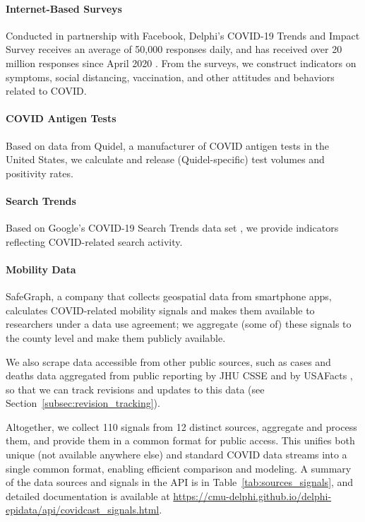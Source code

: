 \documentclass[9pt,twocolumn,twoside,lineno]{pnas-new}
\begin{document}
\paragraph{Internet-Based Surveys} Conducted in partnership with Facebook,
Delphi's COVID-19 Trends and Impact Survey receives an average of 50,000 responses
daily, and has received over 20 million responses since April 2020
\cite{DelphiSurvey, Kreuter:2020}. From the surveys, we construct indicators on
symptoms, social distancing, vaccination, and other attitudes and behaviors
related to COVID.

\paragraph{COVID Antigen Tests} Based on data from Quidel, a manufacturer of
COVID antigen tests in the United States, we calculate and release
(Quidel-specific) test volumes and positivity rates.

\paragraph{Search Trends} Based on Google's COVID-19 Search Trends data set
\cite{GoogleSymptoms}, we provide indicators reflecting COVID-related search
activity.

\paragraph{Mobility Data} SafeGraph, a company that collects geospatial data
from smartphone apps, calculates COVID-related mobility signals
\cite{SafeGraphSocial, SafeGraphPatterns} and makes them available to
researchers under a data use agreement; we aggregate (some of) these signals to
the county level and make them publicly available.

\medskip
We also scrape data accessible from other public sources, such as cases and
deaths data aggregated from public reporting by JHU CSSE \cite{Dong:2020} and by
USAFacts \cite{USAFacts}, so that we can track revisions and updates to this data
(see Section~\ref{subsec:revision_tracking}).

Altogether, we collect 110 signals from 12 distinct sources, aggregate and
process them, and provide them in a common format for public access. This
unifies both unique (not available anywhere else) and standard COVID data
streams into a single common format, enabling efficient comparison and modeling.
A summary of the data sources and signals in the API is in
Table~\ref{tab:sources_signals}, and detailed documentation is available at
\url{https://cmu-delphi.github.io/delphi-epidata/api/covidcast_signals.html}.
\end{document}
